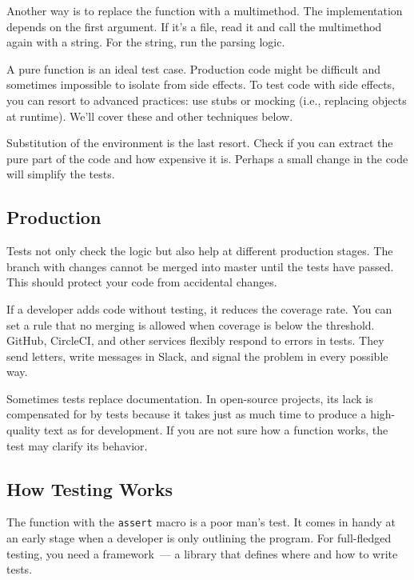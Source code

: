 \fi

Another way is to replace the function with a multimethod. The implementation depends on the first argument. If it's a file, read it and call the multimethod again with a string. For the string, run the parsing logic.

A pure function is an ideal test case. Production code might be difficult and sometimes impossible to isolate from side effects. To test code with side effects, you can resort to advanced practices: use stubs or mocking (i.e., replacing objects at runtime). We'll cover these and other techniques below.

Substitution of the environment is the last resort. Check if you can extract the pure part of the code and how expensive it is. Perhaps a small change in the code will simplify the tests.

\subsection{Production}


Tests not only check the logic but also help at different production stages. The branch with changes cannot be merged into master until the tests have passed. This should protect your code from accidental changes.

If a developer adds code without testing, it reduces the coverage rate. You can set a rule that no merging is allowed when coverage is below the threshold. GitHub, CircleCI, and other services flexibly respond to errors in tests. They send letters, write messages in Slack, and signal the problem in every possible way.

Sometimes tests replace documentation. In open-source projects, its lack is compensated for by tests because it takes just as much time to produce a high-quality text as for development. If you are not sure how a function works, the test may clarify its behavior.

\subsection{How Testing Works}

The function with the \verb|assert| macro is a poor man's test. It comes in handy at an early stage when a developer is only outlining the program. For full-fledged testing, you need a framework~--- a library that defines where and how to write tests.

